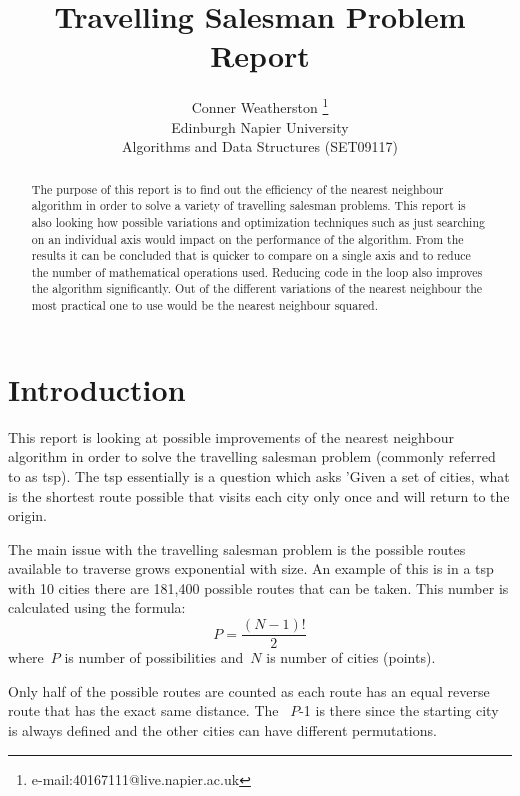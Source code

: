 \documentclass[conference,backref=page]{acmsiggraph}
\title{Travelling Salesman Problem\\
	   Report}
\author{Conner Weatherston \thanks{e-mail:40167111@live.napier.ac.uk} \\
Edinburgh Napier University\\
Algorithms and Data Structures (SET09117)}
\begin{document}
\maketitle

\raggedbottom

\begin{abstract}

The purpose of this report is to find out the efficiency of the nearest neighbour algorithm in order to solve a  variety of travelling salesman problems. This report is also looking how possible variations and optimization techniques such as just searching on an individual axis would impact on the performance of the algorithm. From the results it can be concluded that is quicker to compare on a single axis and to reduce the number of mathematical operations used. Reducing code in the loop also improves the algorithm significantly. Out of the different variations of the nearest neighbour the most practical one to use would be the nearest neighbour squared.
\end{abstract}



\keywordlist


\section{Introduction}

This report is looking at possible improvements of the nearest neighbour algorithm in order to solve the travelling salesman problem (commonly referred to as tsp). The tsp essentially is a question which asks 'Given a set of cities, what is the shortest route possible that visits each city only once and will return to the origin\cite{tsp}.

The main issue with the travelling salesman problem is the possible routes available to traverse grows exponential with size. An example of this is in a tsp with 10 cities there are 181,400 possible routes that can be taken. This number is calculated using the formula:
 \begin{equation}
P =  \frac{(N-1)!}{2}
\end{equation}
where~$P$ is number of possibilities and~$N$ is number of cities (points).


Only half of the possible routes are counted as each route has an equal reverse route that has the exact same distance. The ~$P$-1 is there since the starting city is always defined and the other cities can have different permutations.
\end{document}
